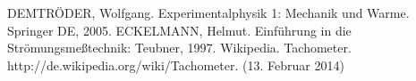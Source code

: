 \pagebreak
\begin{thebibliography}{9}
 DEMTRÖDER, Wolfgang. Experimentalphysik 1: Mechanik und Warme. Springer DE, 2005.
 ECKELMANN, Helmut. Einführung in die Strömungsmeßtechnik: Teubner, 1997.
 Wikipedia. Tachometer. http://de.wikipedia.org/wiki/Tachometer. (13. Februar 2014)
\end{thebibliography}
